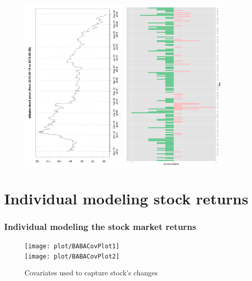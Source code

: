 \documentclass{beamer}
\begin{document}
\begin{frame}
  \begin{figure}
    \includegraphics[width=0.45\textwidth]{plot/Alibaba-Stock-Price-R.png} \includegraphics[width=0.45\textwidth]{plot/Sen-Date.png}
  \end{figure}
\end{frame}

\section{Individual modeling stock returns}

\begin{frame}
  \frametitle{Individual modeling the stock market returns}
  \begin{figure}
    \centering
    \texttt{[image: plot/BABACovPlot1]}\\
    \texttt{[image: plot/BABACovPlot2]}

    \caption{Covariates used to capture stock's changes}
  \end{figure}
\end{frame}
\end{document}
